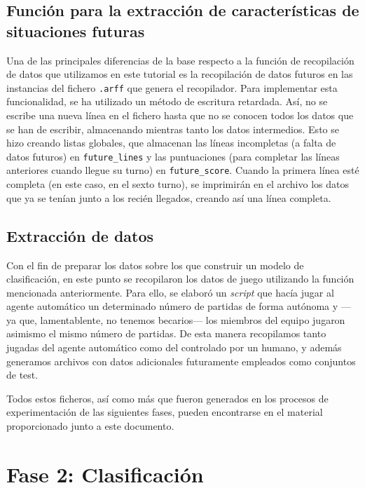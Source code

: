 \documentclass[12pt]{article}
\begin{document}
\subsection{Función para la extracción de características de situaciones futuras}

Una de las principales diferencias de la base respecto a la función de recopilación de datos que utilizamos en este tutorial es la recopilación de datos futuros en las instancias del fichero \texttt{.arff} que genera el recopilador. Para implementar esta funcionalidad, se ha utilizado un método de escritura retardada. Así, no se escribe una nueva línea en el fichero hasta que no se conocen todos los datos que se han de escribir, almacenando mientras tanto los datos intermedios. Esto se hizo creando listas globales, que almacenan las líneas incompletas (a falta de datos futuros) en \texttt{future\_lines} y las puntuaciones (para completar las líneas anteriores cuando llegue su turno) en \texttt{future\_score}. Cuando la primera línea esté completa (en este caso, en el sexto turno), se imprimirán en el archivo los datos que ya se tenían junto a los recién llegados, creando así una línea completa.

\subsection{Extracción de datos}

Con el fin de preparar los datos sobre los que construir un modelo de clasificación, en este punto se recopilaron los datos de juego utilizando la función mencionada anteriormente. Para ello, se elaboró un \emph{script} que hacía jugar al agente automático un determinado número de partidas de forma autónoma y ---ya que, lamentablente, no tenemos becarios--- los miembros del equipo jugaron asimismo el mismo número de partidas. De esta manera recopilamos tanto jugadas del agente automático como del controlado por un humano, y además generamos archivos con datos adicionales futuramente empleados como conjuntos de test.

Todos estos ficheros, así como más que fueron generados en los procesos de experimentación de las siguientes fases, pueden encontrarse en el material proporcionado junto a este documento.

\newpage
\section{Fase 2: Clasificación}
\end{document}
